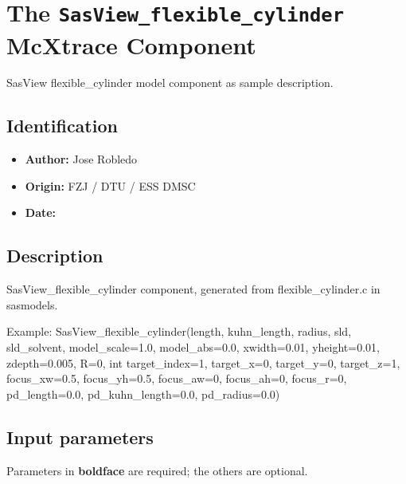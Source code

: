 \section{The \texttt{SasView\_flexible\_cylinder} McXtrace Component}
SasView flexible\_cylinder model component as sample description.

\subsection*{Identification}
\begin{itemize}
  \item \textbf{Author:} Jose Robledo
  \item \textbf{Origin:} FZJ / DTU / ESS DMSC
  \item \textbf{Date:} 
\end{itemize}

\subsection*{Description}
SasView\_flexible\_cylinder component, generated from flexible\_cylinder.c in sasmodels.

Example: SasView\_flexible\_cylinder(length, kuhn\_length, radius, sld, sld\_solvent, model\_scale=1.0, model\_abs=0.0, xwidth=0.01, yheight=0.01, zdepth=0.005, R=0, int target\_index=1, target\_x=0, target\_y=0, target\_z=1, focus\_xw=0.5, focus\_yh=0.5, focus\_aw=0, focus\_ah=0, focus\_r=0, pd\_length=0.0, pd\_kuhn\_length=0.0, pd\_radius=0.0)

\subsection*{Input parameters}
Parameters in \textbf{boldface} are required; the others are optional.

